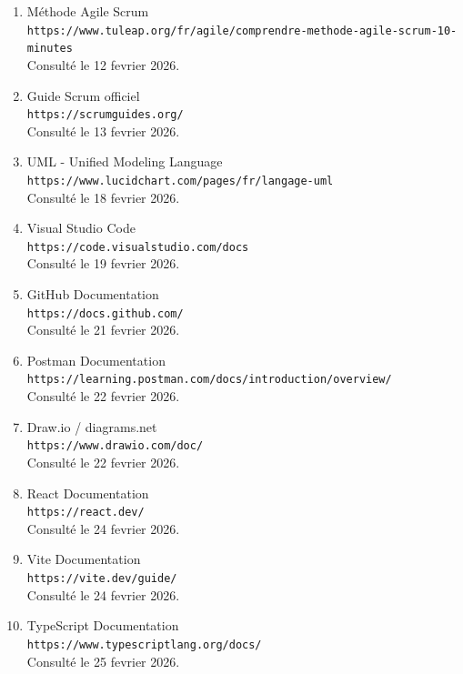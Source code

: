 \documentclass[12pt,a4paper,twoside,openany]{book}
\begin{document}
\begin{enumerate}
    \item Méthode Agile Scrum \\
    \texttt{https://www.tuleap.org/fr/agile/comprendre-methode-agile-scrum-10-minutes} \\
    Consulté le 12 fevrier 2026.

    \item Guide Scrum officiel \\
    \texttt{https://scrumguides.org/} \\
    Consulté le 13 fevrier 2026.

    \item UML - Unified Modeling Language \\
    \texttt{https://www.lucidchart.com/pages/fr/langage-uml} \\
    Consulté le 18 fevrier 2026.

    \item Visual Studio Code \\
    \texttt{https://code.visualstudio.com/docs} \\
    Consulté le 19 fevrier 2026.

    \item GitHub Documentation \\
    \texttt{https://docs.github.com/} \\
    Consulté le 21 fevrier 2026.

    \item Postman Documentation \\
    \texttt{https://learning.postman.com/docs/introduction/overview/} \\
    Consulté le 22 fevrier 2026.

    \item Draw.io / diagrams.net \\
    \texttt{https://www.drawio.com/doc/} \\
    Consulté le 22 fevrier 2026.

    \item React Documentation \\
    \texttt{https://react.dev/} \\
    Consulté le 24 fevrier 2026.

    \item Vite Documentation \\
    \texttt{https://vite.dev/guide/} \\
    Consulté le 24 fevrier 2026.

    \item TypeScript Documentation \\
    \texttt{https://www.typescriptlang.org/docs/} \\
    Consulté le 25 fevrier 2026.


\end{enumerate}
\end{document}
